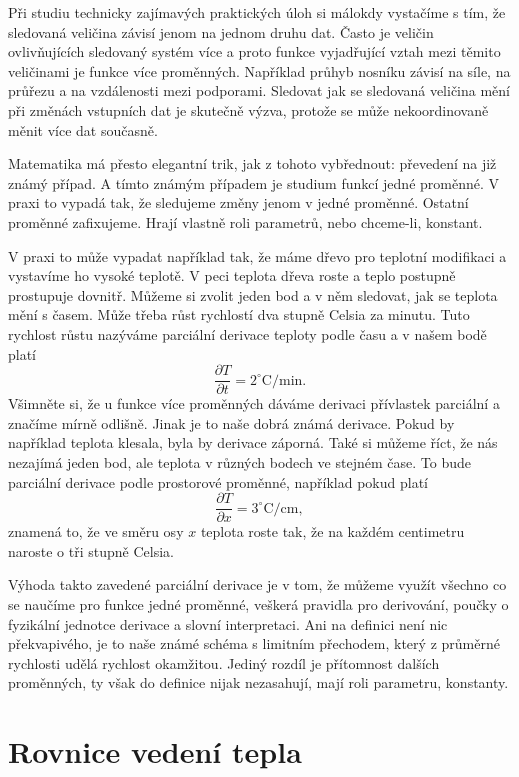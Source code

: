 \documentclass[12pt]{article}
\begin{document}
Při studiu technicky zajímavých praktických úloh si málokdy vystačíme s tím, že sledovaná veličina závisí jenom na jednom druhu dat. Často je veličin ovlivňujících sledovaný systém více a proto funkce vyjadřující vztah mezi těmito veličinami je funkce více proměnných. Například průhyb nosníku závisí na síle, na průřezu a na vzdálenosti mezi podporami. Sledovat jak se sledovaná veličina mění při změnách vstupních dat je skutečně výzva, protože se může nekoordinovaně měnit více dat současně.

Matematika má přesto elegantní trik, jak z tohoto vybřednout: převedení na již známý případ. A tímto známým případem je studium funkcí jedné proměnné. V praxi to vypadá tak, že sledujeme změny jenom v jedné proměnné. Ostatní proměnné zafixujeme. Hrají vlastně roli parametrů, nebo chceme-li, konstant.

V praxi to může vypadat například tak, že máme dřevo pro teplotní modifikaci a vystavíme ho vysoké teplotě. V peci teplota dřeva roste a teplo postupně prostupuje dovnitř. Můžeme si zvolit jeden bod a v něm sledovat, jak se teplota mění s časem. Může třeba růst rychlostí dva stupně Celsia za minutu. Tuto rychlost růstu nazýváme parciální derivace teploty podle času a v našem bodě platí $$\frac{\partial T}{\partial t}=2^{\circ}\mathrm C/\mathrm{min}.$$ Všimněte si, že u funkce více proměnných dáváme derivaci přívlastek parciální a značíme mírně odlišně. Jinak je to naše dobrá známá derivace. Pokud by například teplota klesala, byla by derivace záporná. Také si můžeme říct, že nás nezajímá jeden bod, ale teplota v různých bodech ve stejném čase. To bude parciální derivace podle prostorové proměnné, například pokud platí $$\frac{\partial T}{\partial x}=3^{\circ}\mathrm C/\mathrm{cm},$$ znamená to, že ve směru osy $x$ teplota roste tak, že na každém centimetru naroste o tři stupně Celsia.

Výhoda takto zavedené parciální derivace je v tom, že můžeme využít všechno co se naučíme pro funkce jedné proměnné, veškerá pravidla pro derivování, poučky o fyzikální jednotce derivace a slovní interpretaci. Ani na definici není nic překvapivého, je to naše známé schéma s limitním přechodem, který z průměrné rychlosti udělá rychlost okamžitou. Jediný rozdíl je přítomnost dalších proměnných, ty však do definice nijak nezasahují, mají roli parametru, konstanty.

\newpage
\section*{Rovnice vedení tepla}
\end{document}
